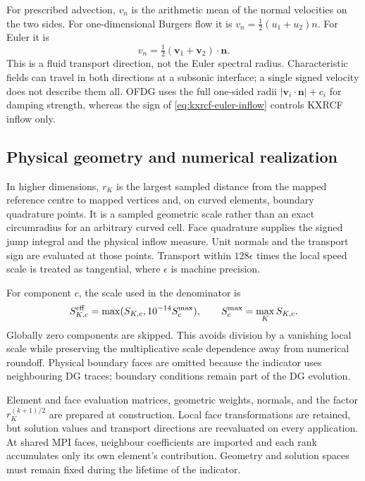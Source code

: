 For prescribed advection, $v_n$ is the arithmetic mean of the normal velocities
on the two sides. For one-dimensional Burgers flow it is
$v_n=\tfrac12(u_1+u_2)n$. For Euler it is
\begin{equation}
 v_n=\tfrac12(\boldsymbol v_1+\boldsymbol v_2)\cdot\boldsymbol n.
 \label{eq:kxrcf-euler-inflow}
\end{equation}
This is a fluid transport direction, not the Euler spectral radius.
Characteristic fields can travel in both directions at a subsonic interface;
a single signed velocity does not describe them all. OFDG uses the full
one-sided radii $|\boldsymbol v_i\cdot\boldsymbol n|+c_i$ for damping strength,
whereas the sign of \cref{eq:kxrcf-euler-inflow} controls KXRCF inflow only.

\subsection{Physical geometry and numerical realization}
\label{sec:kxrcf-realization}
In higher dimensions, $r_K$ is the largest sampled distance from the mapped
reference centre to mapped vertices and, on curved elements, boundary
quadrature points. It is a sampled geometric scale rather than an exact
circumradius for an arbitrary curved cell. Face quadrature supplies the signed
jump integral and the physical inflow measure. Unit normals and the transport
sign are evaluated at those points. Transport within $128\epsilon$ times the
local speed scale is treated as tangential, where $\epsilon$ is machine
precision.

For component $c$, the scale used in the denominator is
\begin{equation}
 S_{K,c}^{\rm eff}=\max(S_{K,c},10^{-14}S_c^{\max}),
 \qquad S_c^{\max}=\max_K S_{K,c}.
\end{equation}
Globally zero components are skipped.
This avoids division by a vanishing local scale while preserving the
multiplicative scale dependence away from numerical roundoff. Physical
boundary faces are omitted because the indicator uses neighbouring DG traces;
boundary conditions remain part of the DG evolution.

Element and face evaluation matrices, geometric weights, normals, and the
factor $r_K^{(k+1)/2}$ are prepared at construction. Local face transformations
are retained, but solution values and transport directions are reevaluated
on every application. At shared MPI faces, neighbour coefficients are imported
and each rank accumulates only its own element's contribution. Geometry and
solution spaces must remain fixed during the lifetime of the indicator.

